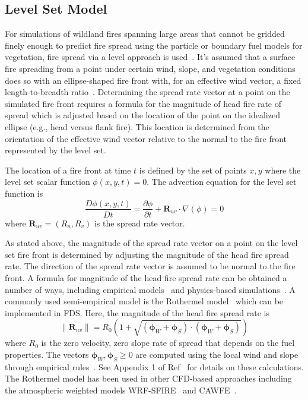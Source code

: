 \documentclass[journal,article,atmosphere,submit,moreauthors,pdftex]{Definitions_Review_Process/mdpi}
\begin{document}
\subsection{Level Set Model}

For simulations of wildland fires spanning large areas that cannot be gridded finely enough to predict fire spread using the particle or boundary fuel models for vegetation, fire spread via a level approach is used~\cite{Bova:IJWF2015}. It's assumed that a surface fire spreading from a point under certain wind, slope, and vegetation conditions does so with an ellipse-shaped fire front with, for an effective wind vector, a fixed length-to-breadth ratio~\cite{Finney:FARSITE,Bova:IJWF2015}. Determining the spread rate vector at a point on the simulated fire front requires a formula for the magnitude of head fire rate of spread which is adjusted based on the location of the point on the idealized ellipse (e.g., head versus flank fire). This location is determined from the orientation of the effective wind vector relative to the normal to the fire front represented by the level set. 

The location of a fire front at time $t$ is defined by the set of points $x,y$ where the level set scalar function $\phi(x,y,t)=0$. The advection equation for the level set function is
\begin{equation}
   \frac{D \phi(x,y,t)}{D t} =  \frac{\partial \phi}{\partial t} + \mathbf{R}_{uv} \cdot \nabla (\phi) = 0 \label{eqn:lset}
\end{equation}
where $\mathbf{R}_{uv}=(R_u,R_v)$ is the spread rate vector. 

As stated above, the magnitude of the spread rate vector on a point on the level set fire front is determined by adjusting the magnitude of the head fire spread rate. The direction of the spread rate vector is assumed to be normal to the fire front. A formula for magnitude of the head fire spread rate can be obtained a number of ways, including empirical models~\cite{Cheney:IJWF1998} and physics-based simulations~\cite{Mell:FBFC2019}. A commonly used semi-empirical model is the Rothermel model~\cite{Rothermel:1972,Albini:1976} which can be implemented in FDS. Here, the magnitude of the head fire spread rate is
\begin{equation}
  \|\mathbf{R}_{uv}\|=R_0 \left(1 + \sqrt{(\boldsymbol{\phi}_W+\boldsymbol{\phi}_S) \cdot (\boldsymbol{\phi}_W+\boldsymbol{\phi}_S) } \right)
\end{equation}
where $R_0$ is the zero velocity, zero slope rate of spread that depends on the fuel properties. The vectors $\boldsymbol{\phi}_W,\boldsymbol{\phi}_S \ge 0$ are computed using the local wind and slope through empirical rules~\cite{Wilson:1980}. See Appendix 1 of Ref~\cite{Bova:IJWF2015} for details on these calculations. The Rothermel model has been used in other CFD-based approaches including the atmospheric weighted models WRF-SFIRE~\cite{Mandel:2014} and CAWFE~\cite{Coen:2}. 
\end{document}
